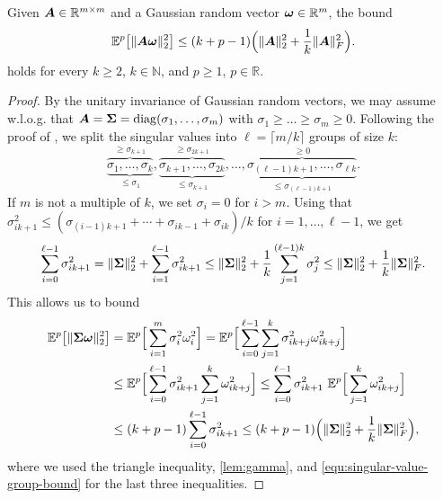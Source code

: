 \begin{lemma}\label{lem:spectral-norm-moment-vector}
    Given $\boldsymbol{A} \in \mathbb{R}^{m \times m}$ and a Gaussian random vector $\boldsymbol{\omega} \in \mathbb{R}^{m}$, the bound
    \begin{equation*}
        \mathbb{E}^{p}\big[ \lVert \boldsymbol{A} \boldsymbol{\omega} \rVert _2^2 \big]
        \leq  (k + p - 1) \Big( \lVert \boldsymbol{A} \rVert _2^2 + \frac{1}{k} \lVert \boldsymbol{A} \rVert _F^2 \Big).        
    \end{equation*}
    holds for every $k \ge 2$, $k\in \mathbb{N}$, and $p \ge 1$, $p\in \mathbb R$.
\end{lemma}%
\begin{proof}
By the unitary invariance of Gaussian random vectors, we may assume w.l.o.g. that $\boldsymbol{A} = \boldsymbol{\Sigma} = \operatorname{diag}(\sigma_1, \dots, \sigma_m)$ with $\sigma_1 \geq \dots \geq \sigma_m \geq 0$.
Following the proof of \cite[Theorem 1]{cohen-2016-optimal-approximate}, we split the singular values into $\ell = \lceil m/k \rceil$ groups of size $k$:
    \begin{equation*}
        \overbrace{\underbrace{\sigma_1, \dots, \sigma_k}_{\leq \sigma_1}}^{\geq \sigma_{k+1}}, \overbrace{\underbrace{\sigma_{k+1}, \dots, \sigma_{2k}}_{\leq \sigma_{k+1}}}^{\geq \sigma_{2k+1}}, \dots, \overbrace{\underbrace{\sigma_{(\ell - 1)k + 1}, \dots, \sigma_{\ell k}}_{\leq \sigma_{(\ell - 1)k + 1}}}^{\geq 0}.
    \end{equation*}
    If $m$ is not a multiple of $k$, we set $\sigma_i = 0$ for $i > m$. Using that
    $\sigma_{ik + 1}^2 \leq ( \sigma_{(i-1)k + 1} + \cdots + \sigma_{ik - 1} + \sigma_{ik} ) / k$ for $i = 1,\ldots, \ell-1$, we get
    \begin{equation}
        \sum_{i=0}^{\ell-1} \sigma_{ik + 1}^2 = \lVert \boldsymbol{\Sigma} \rVert _2^2 + \sum_{i=1}^{\ell-1} \sigma_{ik + 1}^2  \leq \lVert \boldsymbol{\Sigma} \rVert _2^2 + \frac{1}{k} \sum_{j=1}^{(\ell - 1)k} \sigma_j^2 \leq \lVert \boldsymbol{\Sigma} \rVert _2^2 + \frac{1}{k} \lVert \boldsymbol{\Sigma} \rVert _F^2.
        \label{equ:singular-value-group-bound}
    \end{equation}
    This allows us to bound
    \begin{align*}
    \mathbb{E}^{p}\big[ \lVert \boldsymbol{\Sigma} \boldsymbol{\omega} \rVert _2^2 \big] & = 
        \mathbb{E}^{p}\Big[ \sum_{i=1}^{m} \sigma_i^2 \omega_i^2 \Big]
        = \mathbb{E}^{p}\Big[ \sum_{i=0}^{\ell - 1} \sum_{j=1}^{k} \sigma_{ik + j}^2 \omega_{ik + j}^2 \Big] \\
        &\leq \mathbb{E}^{p}\Big[ \sum_{i=0}^{\ell - 1} \sigma_{ik + 1}^2 \sum_{j=1}^{k} \omega_{ik + j}^2 \Big] 
        \leq \sum_{i=0}^{\ell - 1} \sigma_{ik + 1}^2 ~ \mathbb{E}^{p}\Big[ \sum_{j=1}^{k} \omega_{ik + j}^2 \Big] \\
        &\leq (k + p - 1) \sum_{i=0}^{\ell - 1} \sigma_{ik + 1}^2 \leq (k + p - 1) \Big( \lVert \boldsymbol{\Sigma} \rVert _2^2 + \frac{1}{k} \lVert \boldsymbol{\Sigma} \rVert _F^2 \Big), 
    \end{align*}
    where we used the triangle inequality, \cref{lem:gamma}, and \cref{equ:singular-value-group-bound} for the last three inequalities.
\end{proof}

